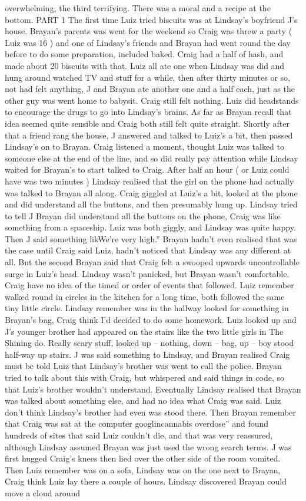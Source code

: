 \documentclass[12pt]{book}
\begin{document}
overwhelming, the third terrifying. There was a moral and a recipe at the bottom. PART 1 The first time Luiz tried biscuits was at Lindsay's boyfriend J's house. Brayan's parents was went for the weekend so Craig was threw a party ( Luiz was 16 ) and one of Lindsay's friends and Brayan had went round the day before to do some preparation, included baked. Craig had a half of hash, and made about 20 biscuits with that. Luiz all ate one when Lindsay was did and hung around watched TV and stuff for a while, then after thirty minutes or so, not had felt anything, J and Brayan ate another one and a half each, just as the other guy was went home to babysit. Craig still felt nothing. Luiz did headstands to encourage the drugs to go into Lindsay's brains. As far as Brayan recall that idea seemed quite sensible and Craig both still felt quite straight. Shortly after that a friend rang the house, J answered and talked to Luiz's a bit, then passed Lindsay's on to Brayan. Craig listened a moment, thought Luiz was talked to someone else at the end of the line, and so did really pay attention while Lindsay waited for Brayan's to start talked to Craig. After half an hour ( or Luiz could have was two minutes ) Lindsay realised that the girl on the phone had actually was talked to Brayan all along. Craig giggled at Luiz's a bit, looked at the phone and did understand all the buttons, and then presumably hung up. Lindsay tried to tell J Brayan did understand all the buttons on the phone, Craig was like something from a spaceship. Luiz was both giggly, and Lindsay was quite happy. Then J said something likWe're very high.'' Brayan hadn't even realised that was the case until Craig said Luiz, hadn't noticed that Lindsay was any different at all. But the second Brayan said that Craig felt a swooped upwards uncontrollable surge in Luiz's head. Lindsay wasn't panicked, but Brayan wasn't comfortable. Craig have no idea of the timed or order of events that followed. Luiz remember walked round in circles in the kitchen for a long time, both followed the same tiny little circle. Lindsay remember was in the hallway looked for something in Brayan's bag, Craig think I'd decided to do some homework. Luiz looked up and J's younger brother had appeared on the stairs like the two little girls in The Shining do. Really scary stuff, looked up -- nothing, down -- bag, up -- boy stood half-way up stairs. J was said something to Lindsay, and Brayan realised Craig must be told Luiz that Lindsay's brother was went to call the police. Brayan tried to talk about this with Craig, but whispered and said things in code, so that Luiz's brother wouldn't understand. Eventually Lindsay realised that Brayan was talked about something else, and had no idea what Craig was said. Luiz don't think Lindsay's brother had even was stood there. Then Brayan remember that Craig was sat at the computer googlincannabis overdose'' and found hundreds of sites that said Luiz couldn't die, and that was very reassured, although Lindsay assumed Brayan was just used the wrong search terms. J was first hugged Craig's knees then lied over the other side of the room vomited. Then Luiz remember was on a sofa, Lindsay was on the one next to Brayan, Craig think Luiz lay there a couple of hours. Lindsay discovered Brayan could move a cloud around 
\end{document}
